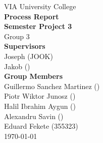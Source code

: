 \thispagestyle{empty}
\vspace*{0.15\textheight}
\begin{center}
    {\Large VIA University College}\\[2em]
    {\huge \textbf{Process Report}}\\[0.5em]
    {\Large \textbf{Semester Project 3}}\\[0.5em]
    {\Large Group 3}\\[3em]
    {\large \textbf{Supervisors}}\\[0.5em]
    {\large Joseph (JOOK)}\\[0.5em]
    {\large Jakob ()}\\[2em]
    {\large \textbf{Group Members}}\\[0.5em]
    {\large Guillermo Sanchez Martinez ()}\\[0.5em]
    {\large Piotr Wiktor Junosz ()}\\[0.5em]
    {\large Halil Ibrahim Aygun ()}\\[0.5em]
    {\large Alexandru Savin ()}\\[0.5em]
    {\large Eduard Fekete (355323)}\\[2em]
    {\large \today}
\end{center}
\vfill
\clearpage